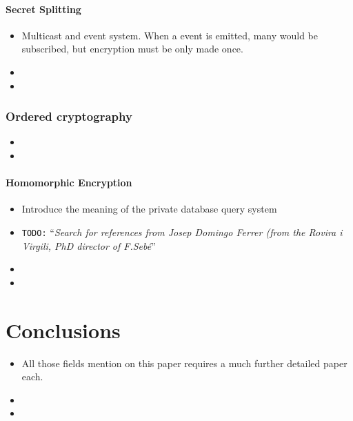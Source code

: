 \documentclass[10pt,a4paper,twoside]{llncs}
\newcommand{\todo}[1]{\texttt{\color{red}TODO:} ``\emph{#1}''}
\begin{document}
 
\paragraph*{Secret Splitting \label{sec:secretSplitting}}

\begin{itemize}
    \item Multicast and event system. When a event is emitted, many would be subscribed, but encryption must be only made once.
    \item
    \item
\end{itemize}


\subsubsection{Ordered cryptography \label{sec:orderedCrypto}}

\begin{itemize}
    \item 
    \item 
\end{itemize}


\paragraph{Homomorphic Encryption \label{sec:Homorph}}

\begin{itemize}
    \item Introduce the meaning of the private database query system \cite{iacr422}
    \item \todo{Search for references from \emph{Josep Domingo Ferrer} (from the Rovira i Virgili, PhD director of F.Seb\'e}
    \item 
    \item 
\end{itemize}


\section{Conclusions \label{sec:conclusions}}

\begin{itemize}
    \item All those fields mention on this paper requires a much further detailed paper each.
    \item 
    \item
\end{itemize}
\end{document}
